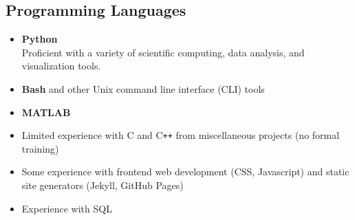 \documentclass[11pt,letterpaper,sans]{moderncv}
\begin{document}
\subsection{Programming Languages} \vspace{5pt}
\begin{itemize}[itemsep=0pt]
    \item \textbf{Python}\\
        Proficient with a variety of scientific computing, data analysis, and
        visualization tools.

    \item \textbf{Bash} and other Unix command line interface (CLI) tools

   \item \textbf{MATLAB}
   \item Limited experience with C and C\texttt{++} from miscellaneous projects (no formal training)
 \item Some experience with frontend web development (CSS, Javascript) and
       static site generators (Jekyll, GitHub Pages)
       \item Experience with SQL
\end{itemize}
\end{document}
